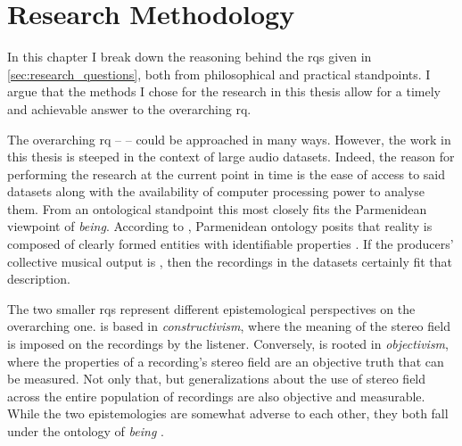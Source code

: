\chapter{Research Methodology}
\label{ch:methodology}



In this chapter I break down the reasoning behind the \glspl{rq} given in \cref{sec:research_questions}, both from philosophical and practical standpoints. I argue that the methods I chose for the research in this thesis allow for a timely and achievable answer to the overarching \gls{rq}.

The overarching \gls{rq} --  -- could be approached in many ways. However, the work in this thesis is steeped in the context of large audio datasets. Indeed, the reason for performing the research at the current point in time is the ease of access to said datasets along with the availability of computer processing power to analyse them. From an ontological standpoint this most closely fits the Parmenidean viewpoint of \textit{being}. According to \citeauthor{grayDoingResearchReal2004}, Parmenidean ontology posits that reality is composed of clearly formed entities with identifiable properties \cite{grayDoingResearchReal2004}. If the producers' collective musical output is , then the recordings in the datasets certainly fit that description.

The two smaller \glspl{rq} represent different epistemological perspectives on the overarching one. \rqa{} is based in \textit{constructivism}, where the meaning of the stereo field is imposed on the recordings by the listener. Conversely, \rqb{} is rooted in \textit{objectivism}, where the properties of a recording's stereo field are an objective truth that can be measured. Not only that, but generalizations about the use of stereo field across the entire population of recordings are also objective and measurable. While the two epistemologies are somewhat adverse to each other, they both fall under the ontology of \textit{being} \cite{chiaProductionManagementKnowledge2002}.

